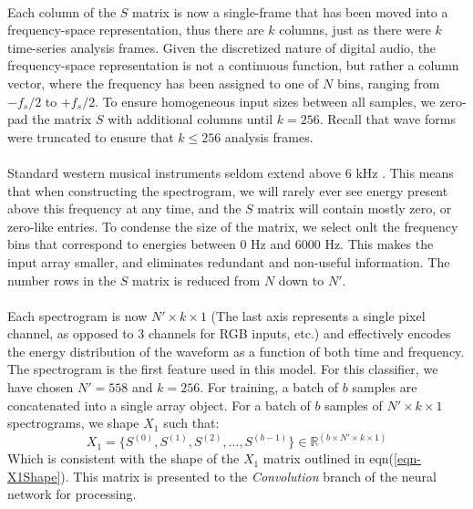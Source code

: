 \documentclass[12pt,letterpaper]{article}
\begin{document}
\paragraph*{}Each column of the $S$ matrix is now a single-frame that has been moved into a frequency-space representation, thus there are $k$ columns, just as there were $k$ time-series analysis frames. Given the discretized nature of digital audio, the frequency-space representation is not a continuous function, but rather a column vector, where the frequency has been assigned to one of $N$ bins, ranging from $-f_s / 2$ to $+f_s/2$. To ensure homogeneous input sizes between all samples, we zero-pad the matrix $S$ with additional columns until $k = 256$. Recall that wave forms were truncated to ensure that $k \leq 256$ analysis frames.

\paragraph*{}Standard western musical instruments seldom extend above $6$ kHz \cite{Olson,Virtanen,White}. This means that when constructing the spectrogram, we will rarely ever see energy present above this frequency at any time, and the $S$ matrix will contain mostly zero, or zero-like entries. To condense the size of the matrix, we select onlt the frequency bins that correspond to energies between $0$ Hz and $6000$ Hz. This makes the input array smaller, and eliminates redundant and non-useful information. The number rows in the $S$ matrix is reduced from $N$ down to $N'$. 

\paragraph*{}Each spectrogram is now $N' \times k \times 1$ (The last axis represents a single pixel channel, as opposed to $3$ channels for RGB inputs, etc.) and effectively encodes the energy distribution of the waveform as a function of both time and frequency. The spectrogram is the first feature used in this model. For this classifier, we have chosen $N' = 558$ and $k = 256$. For training, a batch of $b$ samples are concatenated into a single array object. For a batch of $b$ samples of $N' \times k \times 1$ spectrograms, we shape $X_1$ such that:
\begin{equation}
\label{eqn-X1 shape}
X_1 = \big\{ S^{(0)},S^{(1)},S^{(2)}, ... , S^{(b-1)} \big\} \in \mathbb{R}^{(b \times N' \times k \times 1)}
\end{equation}
Which is consistent with the shape of the $X_1$ matrix outlined in eqn(\ref{eqn-X1Shape}). This matrix is presented to the \textit{Convolution} branch of the neural network for processing.
\end{document}

